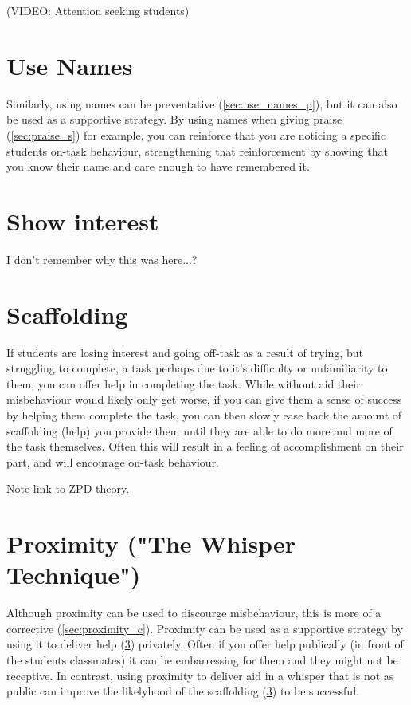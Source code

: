 \documentclass[12pt]{report}
\begin{document}
(VIDEO: Attention seeking students)


\section{Use Names}
\label{sec:use_names_s}

Similarly, using names can be preventative (\ref{sec:use_names_p}), but it can also be used as a supportive strategy. By using names when giving praise (\ref{sec:praise_s}) for example, you can reinforce that you are noticing a specific students on-task behaviour, strengthening that reinforcement by showing that you know their name and care enough to have remembered it.


\section{Show interest}
\label{sec:show_interest_s}

I don't remember why this was here...?

\section{Scaffolding}
\label{sec:scaffolding_s}

If students are losing interest and going off-task as a result of trying, but struggling to complete, a task perhaps due to it's difficulty or unfamiliarity to them, you can offer help in completing the task. While without aid their misbehaviour would likely only get worse, if you can give them a sense of success by helping them complete the task, you can then slowly ease back the amount of scaffolding (help) you provide them until they are able to do more and more of the task themselves. Often this will result in a feeling of accomplishment on their part, and will encourage on-task behaviour.

Note link to ZPD theory.


\section{Proximity ("The Whisper Technique")}
\label{sec:proximity_s}

Although proximity can be used to discourge misbehaviour, this is more of a corrective (\ref{sec:proximity_c}). Proximity can be used as a supportive strategy by using it to deliver help (\ref{sec:scaffolding_s}) privately. Often if you offer help publically (in front of the students classmates) it can be embarressing for them and they might not be receptive. In contrast, using proximity to deliver aid in a whisper that is not as public can improve the likelyhood of the scaffolding (\ref{sec:scaffolding_s}) to be successful.
\end{document}
